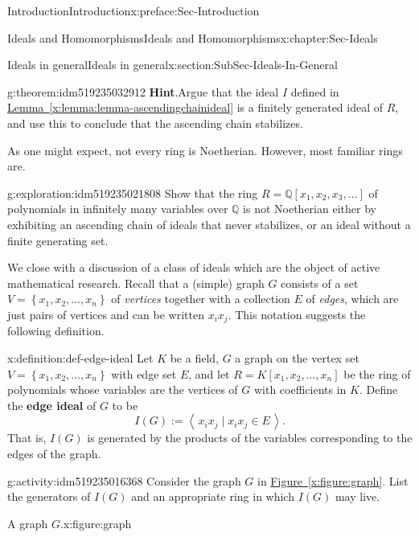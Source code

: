 \documentclass[oneside,10pt,]{book}
\newcommand{\blocktitlefont}{\relax}
\newcommand{\xreffont}{\relax}
\newcommand{\terminology}[1]{\textbf{#1}}
\numberwithin{equation}{section}
\newcommand{\ideal}[1]{\left\langle\, #1 \,\right\rangle}
\newcommand{\set}[1]{\left\{ {#1} \right\}}
\def\Q{{\mathbb Q}}
\begin{document}
\begin{preface}{Introduction}{}{Introduction}{}{}{x:preface:Sec-Introduction}
\begin{chapterptx}{Ideals and Homomorphisms}{}{Ideals and Homomorphisms}{}{}{x:chapter:Sec-Ideals}
\begin{sectionptx}{Ideals in general}{}{Ideals in general}{}{}{x:section:SubSec-Ideals-In-General}
\begin{theorem}{}{}{g:theorem:idm519235032912}
\textbf{\blocktitlefont Hint}.\quad{}Argue that the ideal \(I\) defined in \hyperref[x:lemma:lemma-ascendingchainideal]{Lemma~{\xreffont\ref{x:lemma:lemma-ascendingchainideal}}} is a finitely generated ideal of \(R\), and use this to conclude that the ascending chain stabilizes.%
\end{theorem}
As one might expect, not every ring is Noetherian. However, most familiar rings are.%
\begin{exploration}{}{g:exploration:idm519235021808}%
Show that the ring \(R = \Q[x_1, x_2, x_3, \ldots]\) of polynomials in infinitely many variables over \(\Q\) is not Noetherian either by exhibiting an ascending chain of ideals that never stabilizes, or an ideal without a finite generating set.%
\end{exploration}
We close with a discussion of a class of ideals which are the object of active mathematical research. Recall that a (simple) graph \(G\) consists of a set \(V = \set{x_1, x_2, \ldots, x_n}\) of \emph{vertices} together with a collection \(E\) of \emph{edges}, which are just pairs of vertices and can be written \(x_i x_j\). This notation suggests the following definition.%
\begin{definition}{}{x:definition:def-edge-ideal}%
Let \(K\) be a field, \(G\) a graph on the vertex set \(V = \set{x_1, x_2, \ldots, x_n}\) with edge set \(E\), and let \(R = K[x_1, x_2, \ldots, x_n]\) be the ring of polynomials whose variables are the vertices of \(G\) with coefficients in \(K\). Define the \terminology{edge ideal} of \(G\) to be%
\begin{equation*}
I(G) := \ideal{x_i x_j \mid x_i x_j\in E}.
\end{equation*}
That is, \(I(G)\) is generated by the products of the variables corresponding to the edges of the graph.%
\end{definition}
\begin{activity}{}{g:activity:idm519235016368}%
Consider the graph \(G\) in \hyperref[x:figure:graph]{Figure~{\xreffont\ref{x:figure:graph}}}. List the generators of \(I(G)\) and an appropriate ring in which \(I(G)\) may live.%
\end{activity}
\begin{figureptx}{A graph \(G\).}{x:figure:graph}{}%
\begin{image}{0.25}{0.5}{0.25}%

\end{image}
\end{figureptx}
\end{sectionptx}
\end{chapterptx}
\end{preface}
\end{document}
